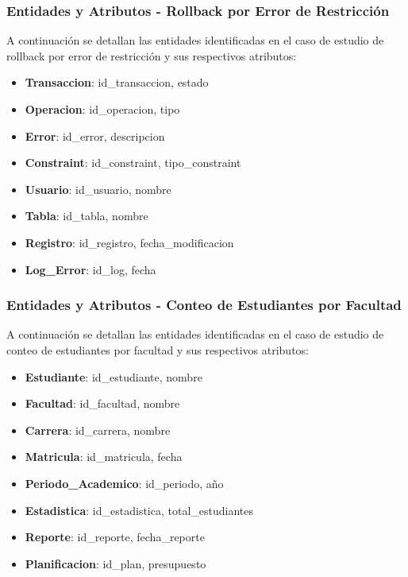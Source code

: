 \documentclass{article}
\begin{document}
\subsubsection{Entidades y Atributos - Rollback por Error de Restricción}

A continuación se detallan las entidades identificadas en el caso de estudio de rollback por error de restricción y sus respectivos atributos:

\begin{itemize}
    \item \textbf{Transaccion}: id\_transaccion, estado
    \item \textbf{Operacion}: id\_operacion, tipo
    \item \textbf{Error}: id\_error, descripcion
    \item \textbf{Constraint}: id\_constraint, tipo\_constraint
    \item \textbf{Usuario}: id\_usuario, nombre
    \item \textbf{Tabla}: id\_tabla, nombre
    \item \textbf{Registro}: id\_registro, fecha\_modificacion
    \item \textbf{Log\_Error}: id\_log, fecha
\end{itemize}

\subsubsection{Entidades y Atributos - Conteo de Estudiantes por Facultad}

A continuación se detallan las entidades identificadas en el caso de estudio de conteo de estudiantes por facultad y sus respectivos atributos:

\begin{itemize}
    \item \textbf{Estudiante}: id\_estudiante, nombre
    \item \textbf{Facultad}: id\_facultad, nombre
    \item \textbf{Carrera}: id\_carrera, nombre
    \item \textbf{Matricula}: id\_matricula, fecha
    \item \textbf{Periodo\_Academico}: id\_periodo, año
    \item \textbf{Estadistica}: id\_estadistica, total\_estudiantes
    \item \textbf{Reporte}: id\_reporte, fecha\_reporte
    \item \textbf{Planificacion}: id\_plan, presupuesto
\end{itemize}
\end{document}
